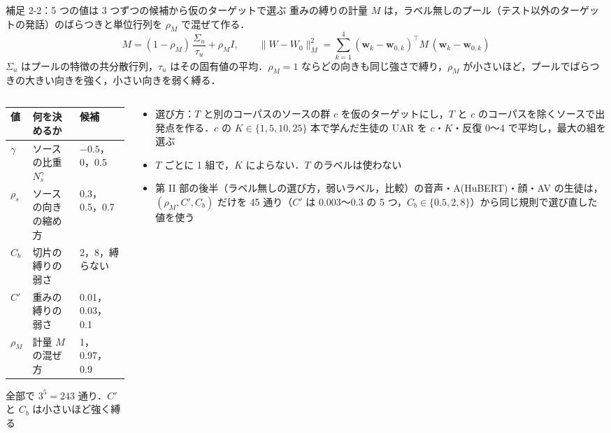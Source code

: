\begin{frame}{補足 2-2：5 つの値は 3 つずつの候補から仮のターゲットで選ぶ}
  \tighteq\scriptsize
  重みの縛りの計量 $M$ は，ラベル無しのプール（テスト以外のターゲットの発話）のばらつきと単位行列を $\rho_M$ で混ぜて作る．
  \[
    M = (1-\rho_M)\,\frac{\Sigma_u}{\tau_u} + \rho_M I,\qquad
    \|W-W_0\|_M^2 = \sum_{k=1}^{4}(\mathbf w_k-\mathbf w_{0,k})^{\top} M\,(\mathbf w_k-\mathbf w_{0,k})
  \]
  $\Sigma_u$ はプールの特徴の共分散行列，$\tau_u$ はその固有値の平均．$\rho_M=1$ ならどの向きも同じ強さで縛り，$\rho_M$ が小さいほど，プールでばらつきの大きい向きを強く，小さい向きを弱く縛る．
  \vspace{0.3em}
  \begin{columns}[T,onlytextwidth]
    \begin{column}{0.5\textwidth}
      \centering
      \setlength{\tabcolsep}{4pt}\renewcommand{\arraystretch}{1.15}
      \begin{tabular}{@{}l l l@{}}
        \toprule
        値 & 何を決めるか & 候補 \\
        \midrule
        $\gamma$ & ソースの比重 $N_s^{\gamma}$ & $-0.5$，0，0.5 \\
        $\rho_s$ & ソースの向きの縮め方 & 0.3，0.5，0.7 \\
        $C_b$ & 切片の縛りの弱さ & 2，8，縛らない \\
        $C'$ & 重みの縛りの弱さ & 0.01，0.03，0.1 \\
        $\rho_M$ & 計量 $M$ の混ぜ方 & 1，0.97，0.9 \\
        \bottomrule
      \end{tabular}\par
      \vspace{0.2em}
      {\scriptsize 全部で $3^5 = 243$ 通り．$C'$ と $C_b$ は小さいほど強く縛る\par}
    \end{column}
    \begin{column}{0.48\textwidth}
      \begin{itemize}\scriptsize\setlength{\itemsep}{3pt}
        \item 選び方：$T$ と別のコーパスのソースの群 $c$ を仮のターゲットにし，$T$ と $c$ のコーパスを除くソースで出発点を作る．$c$ の $K\in\{1,5,10,25\}$ 本で学んだ生徒の UAR を $c$・$K$・反復 0〜4 で平均し，最大の組を選ぶ
        \item $T$ ごとに 1 組で，$K$ によらない．$T$ のラベルは使わない
        \item 第 II 部の後半（ラベル無しの選び方，弱いラベル，比較）の音声・A(HuBERT)・顔・AV の生徒は，$(\rho_M, C', C_b)$ だけを 45 通り（$C'$ は 0.003〜0.3 の 5 つ，$C_b\in\{0.5,2,8\}$）から同じ規則で選び直した値を使う
      \end{itemize}
    \end{column}
  \end{columns}
\end{frame}

